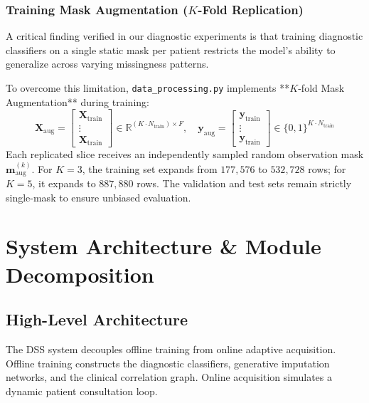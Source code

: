 \documentclass[11pt,a4paper]{report}
\begin{document}
\subsection{Training Mask Augmentation ($K$-Fold Replication)}
A critical finding verified in our diagnostic experiments is that training diagnostic classifiers on a single static mask per patient restricts the model's ability to generalize across varying missingness patterns. 

To overcome this limitation, \texttt{data\_processing.py} implements **$K$-fold Mask Augmentation** during training:
\begin{equation}
  \mathbf{X}_{\text{aug}} = \begin{bmatrix} \mathbf{X}_{\text{train}} \\ \vdots \\ \mathbf{X}_{\text{train}} \end{bmatrix} \in \mathbb{R}^{(K \cdot N_{\text{train}}) \times F}, \quad
  \mathbf{y}_{\text{aug}} = \begin{bmatrix} \mathbf{y}_{\text{train}} \\ \vdots \\ \mathbf{y}_{\text{train}} \end{bmatrix} \in \{0, 1\}^{K \cdot N_{\text{train}}}
\end{equation}
Each replicated slice receives an independently sampled random observation mask $\mathbf{m}_{\text{aug}}^{(k)}$. For $K=3$, the training set expands from $177,576$ to $532,728$ rows; for $K=5$, it expands to $887,880$ rows. The validation and test sets remain strictly single-mask to ensure unbiased evaluation.

\chapter{System Architecture \& Module Decomposition}

\section{High-Level Architecture}
The DSS system decouples offline training from online adaptive acquisition. Offline training constructs the diagnostic classifiers, generative imputation networks, and the clinical correlation graph. Online acquisition simulates a dynamic patient consultation loop.
\end{document}
